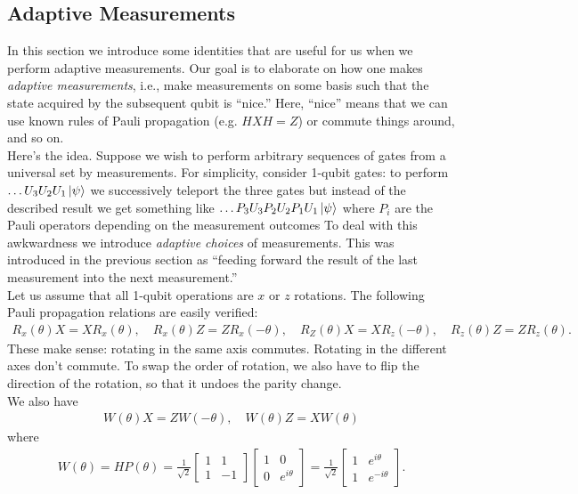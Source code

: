 \documentclass{book}
\theoremstyle{definition}
\newcommand{\f}[2]{\frac{#1}{#2}}
\begin{document}
\subsection{Adaptive Measurements}

In this section we introduce some identities that are useful for us when we perform adaptive measurements. Our goal is to elaborate on how one makes \textit{adaptive measurements}, i.e., make measurements on some basis such that the state acquired by the subsequent qubit is ``nice.'' Here, ``nice'' means that we can use known rules of Pauli propagation (e.g. $HXH = Z$) or commute things around, and so on.\\ 


Here's the idea. Suppose we wish to perform arbitrary sequences of gates from a universal set by measurements. For simplicity, consider 1-qubit gates: to perform $\dots U_3 U_2 U_1\ket{\psi}$ we successively teleport the three gates but instead of the described result we get something like $\dots P_3 U_3 P_2 U_2 P_1U_1\ket{\psi}$ where $P_i$ are the Pauli operators depending on the measurement outcomes To deal with this awkwardness we introduce \textit{adaptive choices} of measurements. This was introduced in the previous section as ``feeding forward the result of the last measurement into the next measurement.'' \\

Let us assume that all 1-qubit operations are $x$ or $z$ rotations. The following Pauli propagation relations are easily verified:
\begin{align}
R_x(\theta)X = XR_x(\theta), \quad R_x(\theta)Z = ZR_x(-\theta), \quad R_Z(\theta)X=XR_z(-\theta), \quad R_z(\theta)Z = ZR_z(\theta).
\end{align}
These make sense: rotating in the same axis commutes. Rotating in the different axes don't commute. To swap the order of rotation, we also have to flip the direction of the rotation, so that it undoes the parity change. \\

We also have
\begin{align}
W(\theta)X = ZW(-\theta), \quad W(\theta)Z = XW(\theta)
\end{align}
where
\begin{align}
W(\theta) = HP(\theta) = \f{1}{\sqrt{2}}\begin{bmatrix}
1 & 1 \\  1 & -1
\end{bmatrix}\begin{bmatrix}
1 & 0 \\ 0 & e^{i\theta}
\end{bmatrix} = \f{1}{\sqrt{2}}\begin{bmatrix}
1 & e^{i\theta} \\ 1& e^{-i\theta}
\end{bmatrix}.
\end{align}
\end{document}

